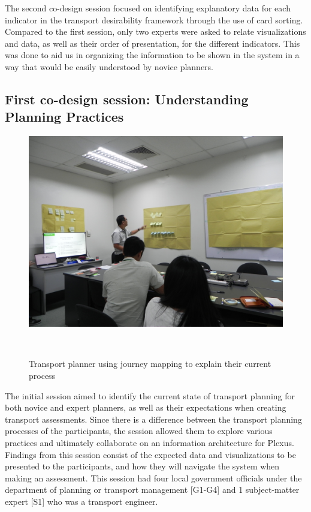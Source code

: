 \documentclass{sigchi}
\begin{document}
The second co-design session focused on identifying explanatory data for each indicator in the transport desirability framework through the use of card sorting. Compared to the first session, only two experts were asked to relate visualizations and data, as well as their order of presentation, for the different indicators. This was done to aid us in organizing the information to be shown in the system in a way that would be easily understood by novice planners.

\subsection{First co-design session: Understanding Planning Practices}

\begin{figure}
\centering
  \includegraphics[width=0.9\columnwidth]{figures/photos/DSCN9671.JPG}
  \caption{Transport planner using journey mapping to explain their current process}~\label{fig:codesign2}
\end{figure}

The initial session aimed to identify the current state of transport planning for both novice and expert planners, as well as their expectations when creating transport assessments. Since there is a difference between the transport planning processes of the participants, the session allowed them to explore various practices and ultimately collaborate on an information architecture for Plexus. Findings from this session consist of the expected data and visualizations to be presented to the participants, and how they will navigate the system when making an assessment. This session had four local government officials under the department of planning or transport management [G1-G4] and 1 subject-matter expert [S1] who was a transport engineer. 
\end{document}
